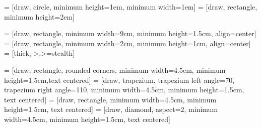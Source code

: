 



\usepackage{amsmath,amsfonts,amssymb,amsthm}

\usepackage{booktabs}
\usepackage{graphicx}

\usepackage[justification=centering]{caption}

\usepackage{calc}

\usepackage{tikz}
\usetikzlibrary{positioning}
\usetikzlibrary{calc}

 = [draw, circle, minimum height=1em, minimum width=1em]
 = [draw, rectangle, minimum height=2em]

\usetikzlibrary{shapes.geometric, arrows}
\usetikzlibrary{fit}

 = [draw, rectangle, minimum width=9cm, minimum height=1.5cm, align=center]
 = [draw, rectangle, minimum width=2cm, minimum height=1cm, align=center]
 = [thick,->,>=stealth]

 = [draw, rectangle, rounded corners, minimum width=4.5cm, minimum height=1.5cm,text centered]
 = [draw, trapezium, trapezium left angle=70, trapezium right angle=110, minimum width=4.5cm, minimum height=1.5cm, text centered]
 = [draw, rectangle, minimum width=4.5cm, minimum height=1.5cm, text centered]
 = [draw, diamond, aspect=2, minimum width=4.5cm, minimum height=1.5cm, text centered]


\newcommand{\troom}{\ensuremath{\hat{T}_{\mathrm{off}}}}
\newcommand{\hroom}{\ensuremath{\hat{h}_{\mathrm{off}}}}
\newcommand{\xa}{\ensuremath{\hat{x}_a}}

\newcommand{\irr}{\ensuremath{I}}
\newcommand{\irrnat}{\ensuremath{\hat{\irr}_{\mathrm{nat}}}}
\newcommand{\irrart}{\ensuremath{\irr_{\mathrm{art}}}}
\newcommand{\pho}{\ensuremath{A}}
\newcommand{\pow}{\ensuremath{P}}

\newcommand{\irrdelta}{\ensuremath{\irr_{\Delta}}}

\newcommand{\maxirrart}{\ensuremath{\irrart^{\max}}}
\newcommand{\maxpow}{\ensuremath{\pow^{\max}}}

\newcommand{\accirr}{\ensuremath{\irr_{\Sigma}}}
\newcommand{\accpho}{\ensuremath{\pho_{\Sigma}}}
\newcommand{\accpow}{\ensuremath{\pow_{\Sigma}}}

\newcommand{\optaccirr}{\ensuremath{\accirr^{\mathrm{opt}}}}
\newcommand{\maxaccpho}{\ensuremath{\accpho^{\max}}}
\newcommand{\minaccpho}{\ensuremath{\accpho^{\min}}}
\newcommand{\maxaccpow}{\ensuremath{\accpow^{\max}}}
